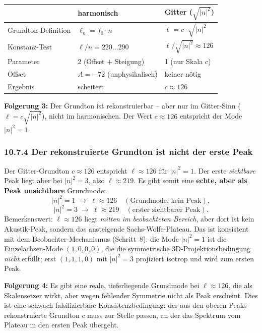 \begin{center}
\begin{tabular}{p{4.5cm}p{3.5cm}p{3.5cm}}
\toprule
 & \textbf{harmonisch} & \textbf{Gitter ($\sqrt{|n|^2}$)} \\
\midrule
Grundton-Definition & $\ell_n = f_0\cdot n$ & $\ell = c\cdot\sqrt{|n|^2}$ \\
Konstanz-Test & $\ell/n = 220\ldots290$ & $\ell/\sqrt{|n|^2} \approx 126$ \\
Parameter & 2 (Offset $+$ Steigung) & 1 (nur Skala $c$) \\
Offset & $A = -72$ (unphysikalisch) & keiner nötig \\
Ergebnis & scheitert & $c \approx 126$ \\
\bottomrule
\end{tabular}
\end{center}

\textbf{Folgerung 3:} Der Grundton ist rekonstruierbar -- aber nur im
Gitter-Sinn ($\ell = c\sqrt{|n|^2}$), nicht im harmonischen. Der Wert
$c \approx 126$ entspricht der Mode $|n|^2 = 1$.

\subsubsection*{10.7.4 Der rekonstruierte Grundton ist nicht der erste Peak}

Der Gitter-Grundton $c \approx 126$ entspricht $\ell \approx 126$ für
$|n|^2 = 1$. Der erste \emph{sichtbare} Peak liegt aber bei
$|n|^2 = 3$, also $\ell \approx 219$. Es gibt somit eine \textbf{echte,
aber als Peak unsichtbare} Grundmode:
\[
  |n|^2 = 1 \;\to\; \ell \approx 126
  \quad(\text{Grundmode, kein Peak}),
\]
\[
  |n|^2 = 3 \;\to\; \ell \approx 219
  \quad(\text{erster sichtbarer Peak}).
\]
Bemerkenswert: $\ell \approx 126$ liegt \emph{mitten im beobachteten
Bereich}, aber dort ist kein Akustik-Peak, sondern das ansteigende
Sachs-Wolfe-Plateau. Das ist konsistent mit dem Beobachter-Mechanismus
(Schritt~8): die Mode $|n|^2=1$ ist die Einzelachsen-Mode $(1,0,0,0)$,
die die symmetrische 3D-Projektionsbedingung \emph{nicht} erfüllt; erst
$(1,1,1,0)$ mit $|n|^2=3$ projiziert isotrop und wird zum ersten Peak.

\textbf{Folgerung 4:} Es gibt eine reale, tieferliegende Grundmode bei
$\ell \approx 126$, die als Skalensetzer wirkt, aber wegen fehlender
Symmetrie nicht als Peak erscheint. Dies ist eine schwach
falsifizierbare Konsistenzbedingung: der aus den oberen Peaks
rekonstruierte Grundton $c$ muss zur Stelle passen, an der das Spektrum
vom Plateau in den ersten Peak übergeht.

